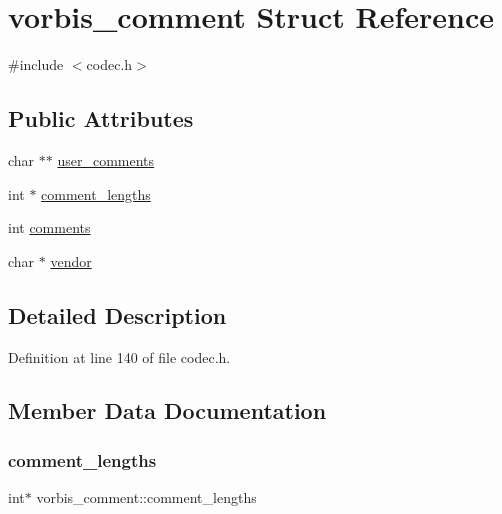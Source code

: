 \hypertarget{structvorbis__comment}{}\section{vorbis\+\_\+comment Struct Reference}
\label{structvorbis__comment}


{\ttfamily \#include $<$codec.\+h$>$}

\subsection*{Public Attributes}
\begin{DoxyCompactItemize}
\item 
char $\ast$$\ast$ \mbox{\hyperlink{structvorbis__comment_ac45cb70542b0be5ce3e8d85db6df48ec}{user\+\_\+comments}}
\item 
int $\ast$ \mbox{\hyperlink{structvorbis__comment_a4698d400a859e9338a5828ead97cacdf}{comment\+\_\+lengths}}
\item 
int \mbox{\hyperlink{structvorbis__comment_aa338208fb0f485b3818832a7d07dbe92}{comments}}
\item 
char $\ast$ \mbox{\hyperlink{structvorbis__comment_a1f25158a2c045a6dd8a13b33b34612d3}{vendor}}
\end{DoxyCompactItemize}


\subsection{Detailed Description}


Definition at line 140 of file codec.\+h.



\subsection{Member Data Documentation}
\mbox{\label{structvorbis__comment_a4698d400a859e9338a5828ead97cacdf}} 
\subsubsection{\texorpdfstring{comment\_lengths}{comment\_lengths}}
{\footnotesize\ttfamily int$\ast$ vorbis\+\_\+comment\+::comment\+\_\+lengths}



